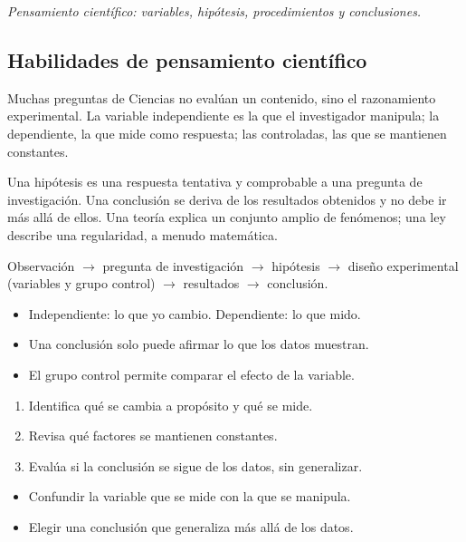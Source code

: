 \documentclass[10pt,a4paper,twocolumn]{article}
\begin{document}
{\itshape\color{zinc700} Pensamiento científico: variables, hipótesis, procedimientos y conclusiones.}

\subsection{Habilidades de pensamiento científico}

Muchas preguntas de Ciencias no evalúan un contenido, sino el razonamiento experimental. La variable independiente es la que el investigador manipula; la dependiente, la que mide como respuesta; las controladas, las que se mantienen constantes.

Una hipótesis es una respuesta tentativa y comprobable a una pregunta de investigación. Una conclusión se deriva de los resultados obtenidos y no debe ir más allá de ellos. Una teoría explica un conjunto amplio de fenómenos; una ley describe una regularidad, a menudo matemática.

\begin{mecanismo}
Observación $\rightarrow$ pregunta de investigación $\rightarrow$ hipótesis $\rightarrow$ diseño experimental (variables y grupo control) $\rightarrow$ resultados $\rightarrow$ conclusión.
\end{mecanismo}

\begin{ideasclave}
\begin{itemize}
  \item Independiente: lo que yo cambio. Dependiente: lo que mido.
  \item Una conclusión solo puede afirmar lo que los datos muestran.
  \item El grupo control permite comparar el efecto de la variable.
\end{itemize}
\end{ideasclave}

\begin{metodo}
\begin{enumerate}
  \item Identifica qué se cambia a propósito y qué se mide.
  \item Revisa qué factores se mantienen constantes.
  \item Evalúa si la conclusión se sigue de los datos, sin generalizar.
\end{enumerate}
\end{metodo}

\begin{errorfrecuente}
\begin{itemize}
  \item Confundir la variable que se mide con la que se manipula.
  \item Elegir una conclusión que generaliza más allá de los datos.
\end{itemize}
\end{errorfrecuente}
\end{document}
